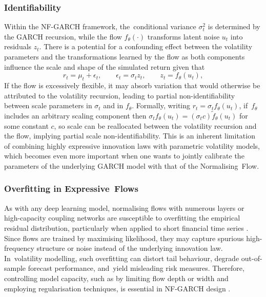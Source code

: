\documentclass[risks,article,accept,pdftex,moreauthors]{Definitions/mdpi}
\begin{document}
\subsubsection{Identifiability}
Within the NF-GARCH framework, the~conditional variance $\sigma_t^2$ is determined by the GARCH recursion, while the flow $f_\theta(\cdot)$ transforms latent noise $u_t$ into residuals $z_t$. There is a potential for a confounding effect between the volatility parameters and the transformations learned by the flow as both components influence the scale and shape of the simulated return given that
\[
r_t = \mu_t + \epsilon_t, \qquad \epsilon_t = \sigma_t z_t, \qquad z_t = f_\theta(u_t),
\]
If the flow is excessively flexible, it may absorb variation that would otherwise be attributed to the volatility recursion, leading to partial non-identifiability between scale parameters in $\sigma_t$ and in $f_\theta$. Formally, writing $r_t = \sigma_t f_\theta(u_t)$, if~$f_\theta$ includes an arbitrary scaling component then $\sigma_t f_\theta(u_t) = (\sigma_t c) \tilde{f}_\theta(u_t)$ for some constant $c$, so scale can be reallocated between the volatility recursion and the flow, implying partial scale non-identifiability. This is an inherent limitation of combining highly expressive innovation laws with parametric volatility models, which becomes even more important when one wants to jointly calibrate the parameters of the underlying GARCH model with that of the Normalising~Flow.

\subsubsection{Overfitting in Expressive~Flows}
As with any deep learning model, normalising flows with numerous layers or high-capacity coupling networks are susceptible to overfitting the empirical residual distribution, particularly when applied to short financial time series \citep{mongwe2025bayesian}. Since flows are trained by maximising likelihood, they may capture spurious high-frequency structure or noise instead of the underlying innovation law. In~volatility modelling, such overfitting can distort tail behaviour, degrade out-of-sample forecast performance, and~yield misleading risk measures. Therefore, controlling model capacity, such as by limiting flow depth or width and employing regularisation techniques, is essential in NF-GARCH design \citep{mongwe2025bayesian}.
\end{document}
